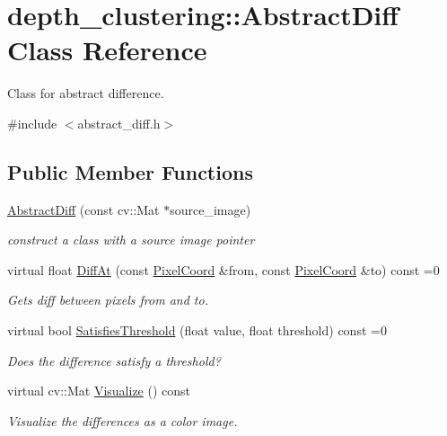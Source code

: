 \hypertarget{classdepth__clustering_1_1AbstractDiff}{}\section{depth\+\_\+clustering\+:\+:Abstract\+Diff Class Reference}
\label{classdepth__clustering_1_1AbstractDiff}


Class for abstract difference.  




{\ttfamily \#include $<$abstract\+\_\+diff.\+h$>$}

\subsection*{Public Member Functions}
\begin{DoxyCompactItemize}
\item 
\hyperlink{classdepth__clustering_1_1AbstractDiff_a14160500db5c2c1c1948a9e563318cc8}{Abstract\+Diff} (const cv\+::\+Mat $\ast$source\+\_\+image)
\begin{DoxyCompactList}\small\item\em construct a class with a source image pointer \end{DoxyCompactList}\item 
virtual float \hyperlink{classdepth__clustering_1_1AbstractDiff_a06ba188d8d83d0e4bad66c833656c26d}{Diff\+At} (const \hyperlink{structdepth__clustering_1_1PixelCoord}{Pixel\+Coord} \&from, const \hyperlink{structdepth__clustering_1_1PixelCoord}{Pixel\+Coord} \&to) const =0
\begin{DoxyCompactList}\small\item\em Gets diff between pixels from and to. \end{DoxyCompactList}\item 
virtual bool \hyperlink{classdepth__clustering_1_1AbstractDiff_a940280569ed86d8f7e95626b1a2312d7}{Satisfies\+Threshold} (float value, float threshold) const =0
\begin{DoxyCompactList}\small\item\em Does the difference satisfy a threshold? \end{DoxyCompactList}\item 
virtual cv\+::\+Mat \hyperlink{classdepth__clustering_1_1AbstractDiff_a45314bf711f35e53590af28bdfc45313}{Visualize} () const
\begin{DoxyCompactList}\small\item\em Visualize the differences as a color image. \end{DoxyCompactList}\end{DoxyCompactItemize}

